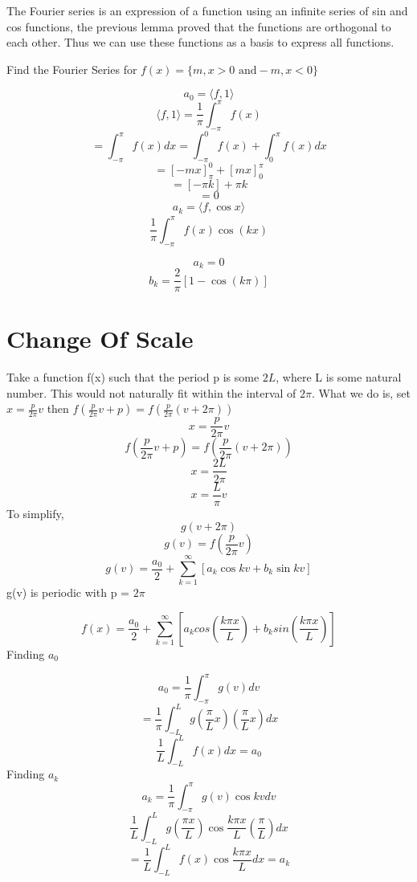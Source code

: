 \documentclass[twoside]{report}
\begin{document}
The Fourier series is an expression of a function using an infinite series of sin and cos functions, the previous lemma proved that the functions are orthogonal to each other. Thus we can use these functions as a basis to express all functions.
\begin{question}
   Find the Fourier Series for $f(x) = \{m, x > 0 \text{ and} -m, x<0\}$
\end{question}
\begin{solution}
   \[
   a_0 = \langle f,1 \rangle	
   \]
   \[
         \langle f,1 \rangle = \frac{1}{\pi} \int^{\pi}_{-\pi}f(x) 
   \]
   \[
   = \int_{-\pi}^{\pi} f(x)dx = \int_{-\pi}^{0}f(x) + \int_0^{\pi} f(x)dx 
   \]
   \[
   = [-mx]^0_\pi + [mx]^\pi_0
   \]
   \[
   = [-\pi k] + \pi k 
   \]
   \[
   	   = 0 
   \]
   \begin{align*}
      a_k = \langle f, \cos{x} \rangle
   \end{align*}
   \[
      \frac{1}{\pi} \int_{-\pi}^{\pi} f(x) \cos{(kx)}
   \]
\end{solution}
\[
	a_k = 0
\]
\[
   b_k = \frac{2}{\pi}[1 - \cos{(k\pi)}]
\]
\section{Change Of Scale} %
Take a function f(x) such that the period p is some $2L$, where L is some natural number. 
This would not naturally fit within the interval of $2\pi$. 
What we do is, set $x = \frac{p}{2\pi}v$ then $f(\frac{p}{2\pi}v + p) = f(\frac{p}{2\pi}(v+2\pi))$
\[
	x = \frac{p}{2\pi}v
\]
\[
	f(\frac{p}{2\pi}v + p) = f(\frac{p}{2\pi}(v+2\pi))
\]
\[
x = \frac{2L}{2\pi}
\]
\[
   x = \frac{L}{\pi}v
\]
To simplify,
\[
	g(v+2\pi)
\]
\[
   g(v) = f(\frac{p}{2\pi}v)
\]
\[
   g(v) = \frac{a_0}{2} + \sum_{k=1}^{\infty}[a_k \cos{kv}+b_k \sin{kv}]
\]
g(v) is periodic with p = $2\pi$

\[
   f(x) = \frac{a_0}{2} + \sum_{k=1}^{\infty}[a_k cos(\frac{k\pi x}{L})+b_k sin(\frac{k\pi x}{L})]
\]
Finding $a_0$

\[
   a_0 = \frac{1}{\pi} \int_{-\pi}^{\pi} g(v) dv
\]
\[
   = \frac{1}{\pi} \int_{-L}^{L} g(\frac{\pi}{L}x)(\frac{\pi }{L}x) dx
\]
\[
   \frac{1}{L} \int_{-L}^{L} f(x) dx = a_0
\]
Finding $a_k$
\[
   a_k = \frac{1}{\pi} \int_{-\pi}^\pi g(v) \cos{kv} dv
\]
\[
   \frac{1}{L} \int_{-L}^{L} g(\frac{\pi x}{L}) \cos{\frac{k\pi x}{L}}(\frac{\pi}{L})dx
\]
\[
   = \frac{1}{L} \int_{-L }^{L} f(x) \cos {\frac{k \pi x}{L}} dx = a_k
\]
\label{sec:Chnge Of Scale}

\end{document}
